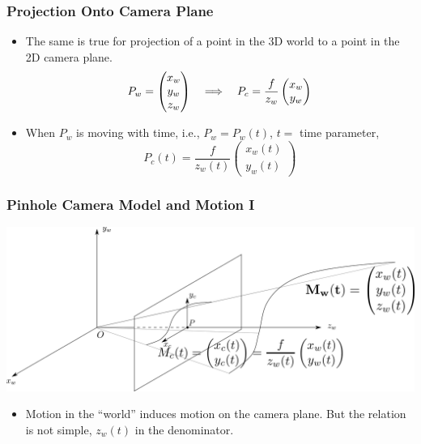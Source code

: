 \documentclass[10pt]{beamer}
\begin{document}
\begin{frame}
  \frametitle{Projection Onto Camera Plane}
  \begin{itemize}
  \item The same is true for projection of a point in the 3D world to a point in the 2D camera plane.
    $$
    P_w =
    \begin{pmatrix}
      x_w\\y_w\\z_w
    \end{pmatrix}
    \quad\Longrightarrow\quad
    P_c =\frac{f}{z_w}
    \begin{pmatrix}
      x_w\\y_w
    \end{pmatrix}
    $$
  \item When $P_w$ is moving with time, i.e., $P_w = P_w(t)$, $t =$ time parameter, 
    $$
    P_c(t) = \frac{f}{z_w(t)}
    \begin{pmatrix}
      x_w(t)\\y_w(t)
    \end{pmatrix}
    $$
  \end{itemize}
\end{frame}


\begin{frame}
  \frametitle{Pinhole Camera Model and Motion I}
  \begin{center}
    \includegraphics[width=\textwidth]{FIGURES/pinholecameramotion}
  \end{center}
  \begin{itemize}
  \item Motion in the ``world'' induces motion on the camera plane. But the relation is
    not simple, $z_w(t)$ in the denominator.
 
  \end{itemize}
\end{frame}
\end{document}
